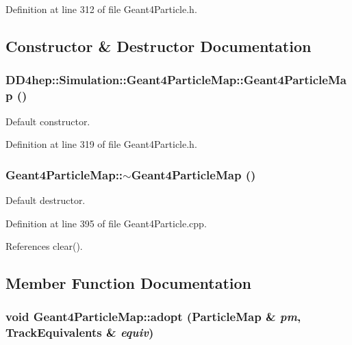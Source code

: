Definition at line 312 of file Geant4Particle.h.

\subsection{Constructor \& Destructor Documentation}
\hypertarget{class_d_d4hep_1_1_simulation_1_1_geant4_particle_map_aeada79751afc2787bc020aff0e413504}{
\subsubsection[{Geant4ParticleMap}]{\setlength{\rightskip}{0pt plus 5cm}DD4hep::Simulation::Geant4ParticleMap::Geant4ParticleMap ()}}
\label{class_d_d4hep_1_1_simulation_1_1_geant4_particle_map_aeada79751afc2787bc020aff0e413504}


Default constructor. 

Definition at line 319 of file Geant4Particle.h.\hypertarget{class_d_d4hep_1_1_simulation_1_1_geant4_particle_map_ab81a69115c8908be2ae5a2cee23bd80e}{
\subsubsection[{$\sim$Geant4ParticleMap}]{\setlength{\rightskip}{0pt plus 5cm}Geant4ParticleMap::$\sim$Geant4ParticleMap ()}}
\label{class_d_d4hep_1_1_simulation_1_1_geant4_particle_map_ab81a69115c8908be2ae5a2cee23bd80e}


Default destructor. 

Definition at line 395 of file Geant4Particle.cpp.

References clear().

\subsection{Member Function Documentation}
\hypertarget{class_d_d4hep_1_1_simulation_1_1_geant4_particle_map_a272d5c51f1c4d6d7b526288f99611811}{
\subsubsection[{adopt}]{\setlength{\rightskip}{0pt plus 5cm}void Geant4ParticleMap::adopt ({\bf ParticleMap} \& {\em pm}, \/  {\bf TrackEquivalents} \& {\em equiv})}}
\label{class_d_d4hep_1_1_simulation_1_1_geant4_particle_map_a272d5c51f1c4d6d7b526288f99611811}


